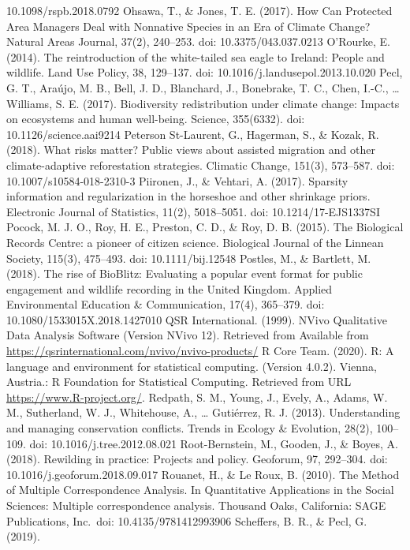 \documentclass[
]{article}
\begin{document}
10.1098/rspb.2018.0792 Ohsawa, T., \& Jones, T. E. (2017). How Can
Protected Area Managers Deal with Nonnative Species in an Era of Climate
Change? Natural Areas Journal, 37(2), 240--253. doi:
10.3375/043.037.0213 O'Rourke, E. (2014). The reintroduction of the
white-tailed sea eagle to Ireland: People and wildlife. Land Use Policy,
38, 129--137. doi: 10.1016/j.landusepol.2013.10.020 Pecl, G. T., Araújo,
M. B., Bell, J. D., Blanchard, J., Bonebrake, T. C., Chen, I.-C.,
\ldots{} Williams, S. E. (2017). Biodiversity redistribution under
climate change: Impacts on ecosystems and human well-being. Science,
355(6332). doi: 10.1126/science.aai9214 Peterson St-Laurent, G.,
Hagerman, S., \& Kozak, R. (2018). What risks matter? Public views about
assisted migration and other climate-adaptive reforestation strategies.
Climatic Change, 151(3), 573--587. doi: 10.1007/s10584-018-2310-3
Piironen, J., \& Vehtari, A. (2017). Sparsity information and
regularization in the horseshoe and other shrinkage priors. Electronic
Journal of Statistics, 11(2), 5018--5051. doi: 10.1214/17-EJS1337SI
Pocock, M. J. O., Roy, H. E., Preston, C. D., \& Roy, D. B. (2015). The
Biological Records Centre: a pioneer of citizen science. Biological
Journal of the Linnean Society, 115(3), 475--493. doi: 10.1111/bij.12548
Postles, M., \& Bartlett, M. (2018). The rise of BioBlitz: Evaluating a
popular event format for public engagement and wildlife recording in the
United Kingdom. Applied Environmental Education \& Communication, 17(4),
365--379. doi: 10.1080/1533015X.2018.1427010 QSR International. (1999).
NVivo Qualitative Data Analysis Software (Version NVivo 12). Retrieved
from Available from
\url{https://qsrinternational.com/nvivo/nvivo-products/} R Core Team.
(2020). R: A language and environment for statistical computing.
(Version 4.0.2). Vienna, Austria.: R Foundation for Statistical
Computing. Retrieved from URL \url{https://www.R-project.org/}. Redpath,
S. M., Young, J., Evely, A., Adams, W. M., Sutherland, W. J.,
Whitehouse, A., \ldots{} Gutiérrez, R. J. (2013). Understanding and
managing conservation conflicts. Trends in Ecology \& Evolution, 28(2),
100--109. doi: 10.1016/j.tree.2012.08.021 Root-Bernstein, M., Gooden,
J., \& Boyes, A. (2018). Rewilding in practice: Projects and policy.
Geoforum, 97, 292--304. doi: 10.1016/j.geoforum.2018.09.017 Rouanet, H.,
\& Le Roux, B. (2010). The Method of Multiple Correspondence Analysis.
In Quantitative Applications in the Social Sciences: Multiple
correspondence analysis. Thousand Oaks, California: SAGE Publications,
Inc.~doi: 10.4135/9781412993906 Scheffers, B. R., \& Pecl, G. (2019).
\end{document}
